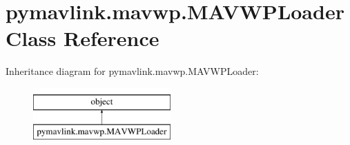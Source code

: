 \hypertarget{classpymavlink_1_1mavwp_1_1MAVWPLoader}{}\section{pymavlink.\+mavwp.\+M\+A\+V\+W\+P\+Loader Class Reference}
\label{classpymavlink_1_1mavwp_1_1MAVWPLoader}
Inheritance diagram for pymavlink.\+mavwp.\+M\+A\+V\+W\+P\+Loader\+:\begin{figure}[H]
\begin{center}
\leavevmode
\includegraphics[height=2.000000cm]{classpymavlink_1_1mavwp_1_1MAVWPLoader}
\end{center}
\end{figure}

